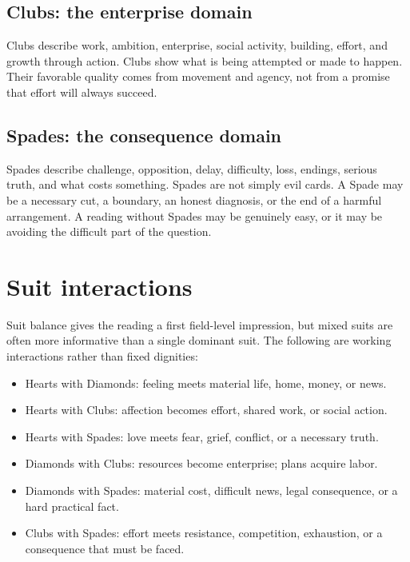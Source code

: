 \subsection{Clubs: the enterprise domain}

Clubs describe work, ambition, enterprise, social activity, building, effort,
and growth through action. Clubs show what is being attempted or made to
happen. Their favorable quality comes from movement and agency, not from a
promise that effort will always succeed.

\subsection{Spades: the consequence domain}

Spades describe challenge, opposition, delay, difficulty, loss, endings,
serious truth, and what costs something. Spades are not simply evil cards. A
Spade may be a necessary cut, a boundary, an honest diagnosis, or the end of a
harmful arrangement. A reading without Spades may be genuinely easy, or it may
be avoiding the difficult part of the question.

\section{Suit interactions}

Suit balance gives the reading a first field-level impression, but mixed suits
are often more informative than a single dominant suit. The following are
working interactions rather than fixed dignities:

\begin{itemize}
\item Hearts with Diamonds: feeling meets material life, home, money, or news.
\item Hearts with Clubs: affection becomes effort, shared work, or social action.
\item Hearts with Spades: love meets fear, grief, conflict, or a necessary truth.
\item Diamonds with Clubs: resources become enterprise; plans acquire labor.
\item Diamonds with Spades: material cost, difficult news, legal consequence, or
      a hard practical fact.
\item Clubs with Spades: effort meets resistance, competition, exhaustion, or a
      consequence that must be faced.
\end{itemize}

